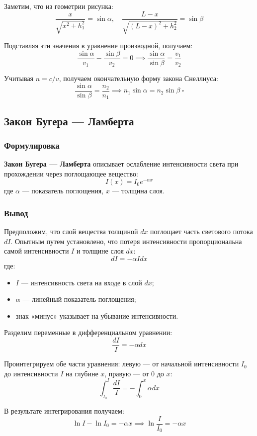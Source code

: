 Заметим, что из геометрии рисунка:
\[
\frac{x}{\sqrt{x^2 + h_1^2}} = \sin \alpha, \quad \frac{L-x}{\sqrt{(L-x)^2 + h_2^2}} = \sin \beta
\]

Подставляя эти значения в уравнение производной, получаем:
\[
\frac{\sin \alpha}{v_1} - \frac{\sin \beta}{v_2} = 0 \implies \frac{\sin \alpha}{\sin \beta} = \frac{v_1}{v_2}
\]

Учитывая $n = c/v$, получаем окончательную форму закона Снеллиуса:
\[
\frac{\sin \alpha}{\sin \beta} = \frac{n_2}{n_1} \implies n_1 \sin \alpha = n_2 \sin \beta\ \square
\]

\subsection{Закон Бугера --- Ламберта}

\subsubsection{Формулировка}

\textbf{Закон Бугера --- Ламберта} описывает ослабление интенсивности света при прохождении через поглощающее вещество:
\[
I(x) = I_0 e^{-\alpha x}
\]
где $\alpha$ --- показатель поглощения, $x$ --- толщина слоя.

\subsubsection{Вывод}

Предположим, что слой вещества толщиной $dx$ поглощает часть светового потока $dI$. Опытным путем установлено, что потеря интенсивности пропорциональна самой интенсивности $I$ и толщине слоя $dx$:
\[
dI = -\alpha I dx
\]
где:
\begin{itemize}
    \item $I$ --- интенсивность света на входе в слой $dx$;
    \item $\alpha$ --- линейный показатель поглощения;
    \item знак «минус» указывает на убывание интенсивности.
\end{itemize}

Разделим переменные в дифференциальном уравнении:
\[
\frac{dI}{I} = -\alpha dx
\]

Проинтегрируем обе части уравнения: левую --- от начальной интенсивности $I_0$ до интенсивности $I$ на глубине $x$, правую --- от $0$ до $x$:
\[
\int_{I_0}^{I} \frac{dI}{I} = -\int_{0}^{x} \alpha dx
\]

В результате интегрирования получаем:
\[
\ln I - \ln I_0 = -\alpha x \implies \ln \frac{I}{I_0} = -\alpha x
\]

